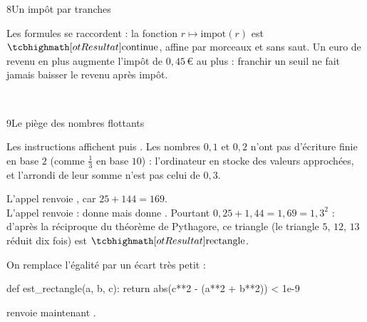 \begin{corrige}{8}{Un impôt par tranches}
\begin{questions}
\begin{codecote}[0.5]
Les formules se raccordent : la fonction $r\mapsto\text{impot}(r)$ est $\res{\text{continue}}$, affine par morceaux et sans saut. Un
euro de revenu en plus augmente l'impôt de $0{,}45$\,€ au plus : franchir un seuil ne fait jamais baisser le revenu après impôt.
\cote
\centering
{}\\[0.5mm]
\end{codecote}
\end{questions}
\end{corrige}

\begin{corrige}{9}{Le piège des nombres flottants}
\begin{questions}
  \item Les instructions affichent  puis . Les nombres $0{,}1$ et $0{,}2$ n'ont pas d'écriture
    finie en base $2$ (comme $\frac13$ en base $10$) : l'ordinateur en stocke des valeurs approchées, et l'arrondi de leur somme n'est pas
    celui de $0{,}3$.
  \item L'appel  renvoie , car $25+144=169$.\\
    L'appel  renvoie  :  donne  mais 
    donne . Pourtant
    $0{,}25+1{,}44=1{,}69=1{,}3^{2}$ : d'après la réciproque du théorème de Pythagore, ce triangle (le triangle $5$, $12$, $13$ réduit dix
    fois) est $\res{\text{rectangle}}$.
  \item On remplace l'égalité par un écart très petit :
\begin{python}
def est_rectangle(a, b, c):
    return abs(c**2 - (a**2 + b**2)) < 1e-9
\end{python}
     renvoie maintenant .
\end{questions}
\end{corrige}

